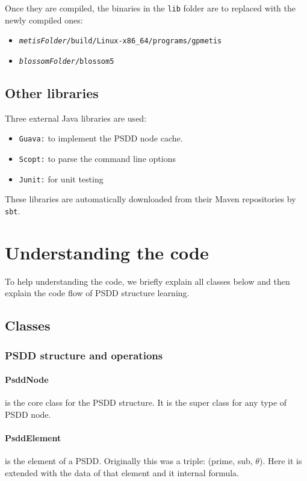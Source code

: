 \documentclass[a4paper,10pt]{article}
\begin{document}
Once they are compiled, the binaries in the {\tt lib} folder are to replaced with the newly compiled ones:
\begin{itemize}
 \item \tt \emph{metisFolder}/build/Linux-x86\_64/programs/gpmetis
 \item \tt \emph{blossomFolder}/blossom5
\end{itemize}


\subsection{Other libraries}
Three external Java libraries are used: 
\begin{itemize}
 \item {\tt Guava:} to implement the PSDD node cache.
 \item {\tt Scopt:} to parse the command line options
 \item {\tt Junit:} for unit testing
\end{itemize}

These libraries are automatically downloaded from their Maven repositories by {\tt sbt}.



\section{Understanding the code}
To help understanding the code, we briefly explain all classes below and then explain the code flow of PSDD structure learning.

\subsection{Classes}
\subsubsection{PSDD structure and operations}

\paragraph{PsddNode} is the core class for the PSDD structure. It is the super class for any type of PSDD node.

\paragraph{PsddElement} is the element of a PSDD. Originally this was a triple: (prime, sub, $\theta$). Here it is extended with the data of that element and it internal formula.
\end{document}

